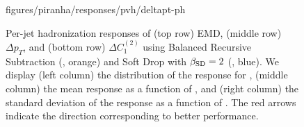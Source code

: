 \begin{figure}[p]
{      {figures/piranha/responses/pvh/deltapt-ph}
      \label{fig:ph_pt_delta}
}
\\
    \caption[Per-jet hadronization responses of the EMD, \(\Delta p_T\), and \(\Delta C_1^{(2)}\) using Balanced Recursive Subtraction and Soft Drop with \(\beta_{\rm SD} = 2\).]{
        Per-jet \gls{hadronization} responses of (top row) EMD, (middle row) \(\Delta p_T\), and (bottom row) \(\Delta C_1^{(2)}\) using Balanced Recursive Subtraction (, orange) and Soft Drop with \(\beta_{\rm SD} = 2\) (, blue).
        We display (left column) the distribution of the response for , (middle column) the mean response as a function of \zcut, and (right column) the standard deviation of the response as a function of \zcut.
    The red arrows indicate the direction corresponding to better performance.
    }
\label{fig:parton_hadron_response}
\end{figure}

